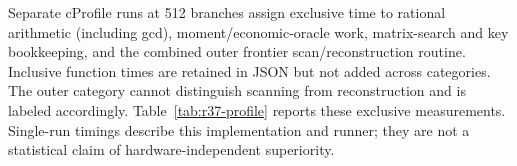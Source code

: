 Separate cProfile runs at 512 branches assign exclusive time to rational arithmetic (including gcd), moment/economic-oracle work, matrix-search and key bookkeeping, and the combined outer frontier scan/reconstruction routine. Inclusive function times are retained in JSON but not added across categories. The outer category cannot distinguish scanning from reconstruction and is labeled accordingly. Table~\ref{tab:r37-profile} reports these exclusive measurements. Single-run timings describe this implementation and runner; they are not a statistical claim of hardware-independent superiority.
